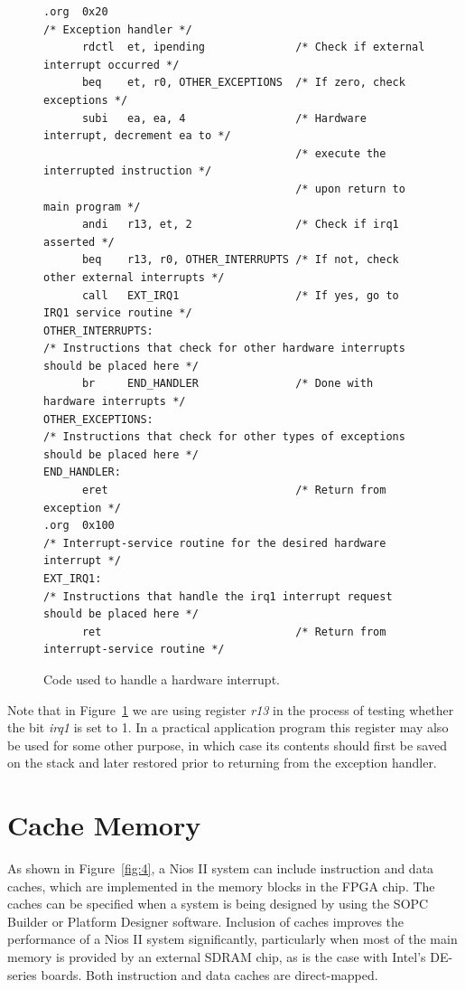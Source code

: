 \documentclass[11pt, twoside, pdftex]{article}
\begin{document}
\begin{figure}[H]
\begin{lstlisting}[style=defaultNiosStyle] %%%\begin{singlespace}
.org  0x20
/* Exception handler */
      rdctl  et, ipending              /* Check if external interrupt occurred */
      beq    et, r0, OTHER_EXCEPTIONS  /* If zero, check exceptions */
      subi   ea, ea, 4                 /* Hardware interrupt, decrement ea to */  
                                       /* execute the interrupted instruction */
                                       /* upon return to main program */ 
      andi   r13, et, 2                /* Check if irq1 asserted */
      beq    r13, r0, OTHER_INTERRUPTS /* If not, check other external interrupts */
      call   EXT_IRQ1                  /* If yes, go to IRQ1 service routine */
OTHER_INTERRUPTS:
/* Instructions that check for other hardware interrupts should be placed here */
      br     END_HANDLER               /* Done with hardware interrupts */
OTHER_EXCEPTIONS:
/* Instructions that check for other types of exceptions should be placed here */
END_HANDLER:
      eret                             /* Return from exception */
.org  0x100
/* Interrupt-service routine for the desired hardware interrupt */
EXT_IRQ1:
/* Instructions that handle the irq1 interrupt request should be placed here */
      ret                              /* Return from interrupt-service routine */
\end{lstlisting}
	\caption{Code used to handle a hardware interrupt.}
	\label{fig:7}
\end{figure}

Note that in Figure~\ref{fig:7} we are using register {\it r13} in the process of testing 
whether the bit {\it irq1} is set to 1. In a practical application program this
register may also be used for some other purpose, in which case its contents
should first be saved on the stack and later restored prior to returning
from the exception handler.

\noindent


\section{Cache Memory}

As shown in Figure~\ref{fig:4}, a Nios II system can include instruction and data caches,
which are implemented in the memory blocks in the FPGA chip.
The caches can be specified when a system is being designed by using the SOPC Builder or Platform Designer
software. Inclusion of caches improves the performance of a Nios II system significantly,
particularly when most of the main memory is provided by an external SDRAM chip, as is 
the case with Intel's DE-series boards. Both instruction and data caches are direct-mapped.
 
\end{document}
